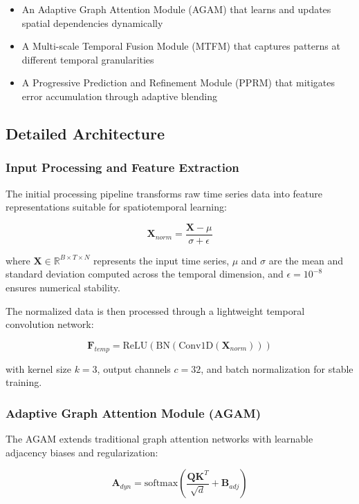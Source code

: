 \documentclass[lettersize, journal]{IEEEtran}
\begin{document}
\begin{itemize}
    \item An Adaptive Graph Attention Module (AGAM) that learns and updates spatial dependencies dynamically
    \item A Multi-scale Temporal Fusion Module (MTFM) that captures patterns at different temporal granularities
    \item A Progressive Prediction and Refinement Module (PPRM) that mitigates error accumulation through adaptive blending
\end{itemize}

\subsection{Detailed Architecture}

\subsubsection{Input Processing and Feature Extraction}
The initial processing pipeline transforms raw time series data into feature representations suitable for spatiotemporal learning:

\begin{equation}
\mathbf{X}_{norm} = \frac{\mathbf{X} - \mu}{\sigma + \epsilon}
\end{equation}

where $\mathbf{X} \in \mathbb{R}^{B \times T \times N}$ represents the input time series, $\mu$ and $\sigma$ are the mean and standard deviation computed across the temporal dimension, and $\epsilon = 10^{-8}$ ensures numerical stability.

The normalized data is then processed through a lightweight temporal convolution network:

\begin{equation}
\mathbf{F}_{temp} = \text{ReLU}(\text{BN}(\text{Conv1D}(\mathbf{X}_{norm})))
\end{equation}

with kernel size $k=3$, output channels $c=32$, and batch normalization for stable training.

\subsubsection{Adaptive Graph Attention Module (AGAM)}
The AGAM extends traditional graph attention networks with learnable adjacency biases and regularization:

\begin{equation}
\mathbf{A}_{dyn} = \text{softmax}\left(\frac{\mathbf{Q}\mathbf{K}^T}{\sqrt{d}} + \mathbf{B}_{adj}\right)
\end{equation}
\end{document}
